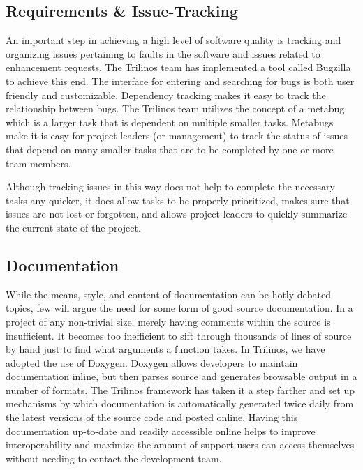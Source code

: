 \documentclass[12pt,relax]{article}
\begin{document}
\subsection{Requirements \& Issue-Tracking}


An important step in achieving a high level of software quality is tracking
and organizing issues pertaining to faults in the software and issues related
to enhancement requests.  The Trilinos team has implemented a tool called
Bugzilla~\cite{Bugzilla} to achieve this end.  The
interface for entering and searching for bugs is both user friendly and
customizable.  Dependency tracking
makes it easy to track the relationship between bugs.  The Trilinos team 
utilizes the concept of a metabug, which is a larger task that is 
dependent on multiple smaller tasks.  Metabugs make it is easy
for project leaders (or management) to track the status of issues that 
depend on many smaller tasks that are to be completed by one or more team 
members.  

Although tracking issues in this way does not help to complete the
necessary tasks any quicker, it does allow tasks to be properly prioritized, 
makes sure that issues are not lost or forgotten, and allows project leaders
to quickly  summarize the current state of the project.

\subsection{Documentation}


While the means, style, and content of documentation can be hotly debated
topics, few will argue the need for some form of good source documentation.
In a project of any non-trivial size, merely having comments within the source
is insufficient.  It becomes too inefficient to sift through thousands of lines
of source by hand just to find what arguments a function takes.  In Trilinos,
we have adopted the use of Doxygen.  Doxygen allows developers to maintain
documentation inline, but then parses source and generates browsable output in
a number of formats.  The Trilinos framework has taken it a step farther and
set up mechanisms by which documentation is automatically generated twice daily
from the latest versions of the source code and posted online.  Having this
documentation up-to-date and readily accessible online helps to improve
interoperability and maximize the amount of support users can access
themselves without needing to contact the development team.
\end{document}
